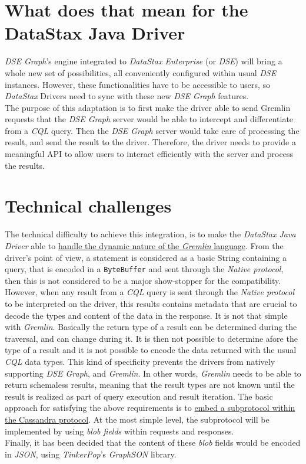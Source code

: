 \documentclass[a4paper]{report}
\newcommand{\djd}{\emph{DataStax Java Driver\xspace}}
\newcommand{\dseg}{\emph{DSE Graph\xspace}}
\newcommand{\tp}{\emph{TinkerPop\xspace}}
\begin{document}
\section{What does that mean for the DataStax Java Driver}
\emph{DSE Graph}'s engine integrated to \emph{DataStax Enterprise} (or \emph{DSE}) will bring a whole new set of possibilities, all conveniently configured within usual \emph{DSE} instances. However, these functionalities have to be accessible to users, so \emph{DataStax} Drivers need to sync with these new \dseg{} features.\\
The purpose of this adaptation is to first make the driver able to send Gremlin requests that the \dseg{} server would be able to intercept and differentiate from a \emph{CQL} query. Then the \dseg{} server would take care of processing the result, and send the result to the driver. Therefore, the driver needs to provide a meaningful API to allow users to interact efficiently with the server and process the results.

\section{Technical challenges}
The technical difficulty to achieve this integration, is to make the \djd{} able to \underline{handle the dynamic nature of the \emph{Gremlin} language}. From the driver's point of view, a statement is considered as a basic String containing a query, that is encoded in a \verb;ByteBuffer; and sent through the \emph{Native protocol}, then this is not considered to be a major show-stopper for the compatibility. However, when any result from a \emph{CQL} query is sent through the \emph{Native protocol} to be interpreted on the driver, this results contains metadata that are crucial to decode the types and content of the data in the response. It is not that simple with \emph{Gremlin}. Basically the return type of a result can be determined during the traversal, and can change during it. It is then not possible to determine afore the type of a result and it is not possible to encode the data returned with the usual \emph{CQL} data types. This kind of specificity prevents the drivers from natively supporting \dseg{}, and \emph{Gremlin}. In other words, \emph{Gremlin} needs to be able to return schemaless results, meaning that the result types are not known until the result is realized as part of query execution and result iteration. The basic approach for satisfying the above requirements is to \underline{embed a subprotocol within the Cassandra protocol}. At the most simple level, the subprotocol will be implemented by using \emph{blob fields} within requests and responses.\\
Finally, it has been decided that the content of these \emph{blob} fields would be encoded in \emph{JSON}, using \tp{}'s \emph{GraphSON} library.






\end{document}
